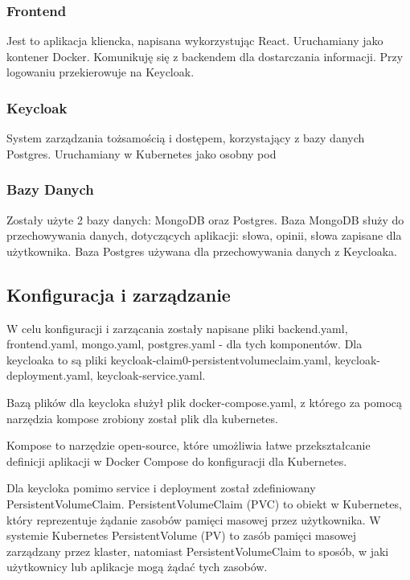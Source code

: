 \documentclass[12pt,a4paper]{article}
\begin{document}
\subsubsection{Frontend}
Jest to aplikacja kliencka, napisana wykorzystując React. Uruchamiany jako kontener Docker. Komunikuję się z backendem dla dostarczania informacji. Przy logowaniu przekierowuje na Keycloak.

\subsubsection{Keycloak}
System zarządzania tożsamością i dostępem, korzystający z bazy danych Postgres. Uruchamiany w Kubernetes jako osobny pod


\subsubsection{Bazy Danych}
Zostały użyte 2 bazy danych: MongoDB oraz Postgres. Baza MongoDB służy do przechowywania danych, dotyczących aplikacji: słowa, opinii, słowa zapisane dla użytkownika. Baza Postgres używana dla przechowywania danych z Keycloaka.


\subsection{Konfiguracja i zarządzanie}
\label{sec:NonFunctionalConditions}


W celu konfiguracji i zarzącania zostały napisane pliki backend.yaml, frontend.yaml, mongo.yaml, postgres.yaml - dla tych komponentów. Dla keycloaka to są pliki keycloak-claim0-persistentvolumeclaim.yaml, keycloak-deployment.yaml, keycloak-service.yaml.

Bazą plików dla keycloka służył plik docker-compose.yaml, z którego za pomocą narzędzia kompose zrobiony został plik dla kubernetes. 

Kompose to narzędzie open-source, które umożliwia łatwe przekształcanie definicji aplikacji w Docker Compose do konfiguracji dla Kubernetes. \cite{kompose}

Dla keycloka pomimo service i deployment został zdefiniowany PersistentVolumeClaim. PersistentVolumeClaim (PVC) to obiekt w Kubernetes, który reprezentuje żądanie zasobów pamięci masowej przez użytkownika. W systemie Kubernetes PersistentVolume (PV) to zasób pamięci masowej zarządzany przez klaster, natomiast PersistentVolumeClaim to sposób, w jaki użytkownicy lub aplikacje mogą żądać tych zasobów. \cite{oktawave}
\end{document}
